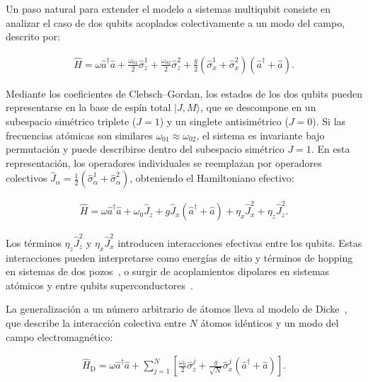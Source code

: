 \documentclass[onecolumn,notitlepage,letterpaper,aps,pra,12pt]{article}
\numberwithin{equation}{section}
\begin{document}
Un paso natural para extender el modelo a sistemas multiqubit consiste en analizar el caso de dos qubits acoplados colectivamente a un modo del campo, descrito por:

\begin{gather}
    \hat{H} = \omega\hat{a}^{\dagger}\hat{a} + \frac{\omega_{01}}{2}\hat{\sigma}_{z}^{1} + \frac{\omega_{02}}{2}\hat{\sigma}_{z}^{2} + \frac{g}{2}\left(\hat{\sigma}_{x}^{1}+\hat{\sigma}_{x}^{2}\right)(\hat{a}^{\dagger}+\hat{a}).
\end{gather}

Mediante los coeficientes de Clebsch–Gordan, los estados de los dos qubits pueden representarse en la base de espín total \( |J,M\rangle \), que se descompone en un subespacio simétrico triplete (\(J=1\)) y un singlete antisimétrico (\(J=0\)). Si las frecuencias atómicas son similares \(\omega_{01} \approx \omega_{02}\), el sistema es invariante bajo permutación y puede describirse dentro del subespacio simétrico \(J=1\). En esta representación, los operadores individuales se reemplazan por operadores colectivos \(\hat{J}_{\alpha}=\tfrac{1}{2}(\hat{\sigma}_{\alpha}^{1}+\hat{\sigma}_{\alpha}^{2})\), obteniendo el Hamiltoniano efectivo:

\begin{gather}\label{Hamiltoniano de Rabi dos qubits con interacciones}
    \hat{H} = \omega \hat{a}^{\dagger}\hat{a} + \omega_{0} \hat{J}_{z} + g \hat{J}_{x} (\hat{a}^{\dagger} + \hat{a}) + \eta_{x} \hat{J}_{x}^{2} + \eta_{z} \hat{J}_{z}^{2}.
\end{gather}

Los términos \(\eta_{z}\hat{J}_{z}^{2}\) y \(\eta_{x}\hat{J}_{x}^{2}\) introducen interacciones efectivas entre los qubits. Estas interacciones pueden interpretarse como energías de sitio y términos de hopping en sistemas de dos pozos~\cite{Garraway2011}, o surgir de acoplamientos dipolares en sistemas atómicos y entre qubits superconductores~\cite{LeBoite2020,kirton2017}.

La generalización a un número arbitrario de átomos lleva al modelo de Dicke~\cite{Dicke54}, que describe la interacción colectiva entre $N$ átomos idénticos y un modo del campo electromagnético:

\begin{gather}
    \hat{H}_{\text{D}} = \omega\hat{a}^{\dagger}\hat{a} + \sum_{j=1}^{N}\left[ \frac{\omega_{0}}{2}\hat{\sigma}_{z}^{j} + \frac{g}{\sqrt{N}}\hat{\sigma}_{x}^{j}\left(\hat{a}^{\dagger} + \hat{a}\right) \right].
\end{gather}
\end{document}
